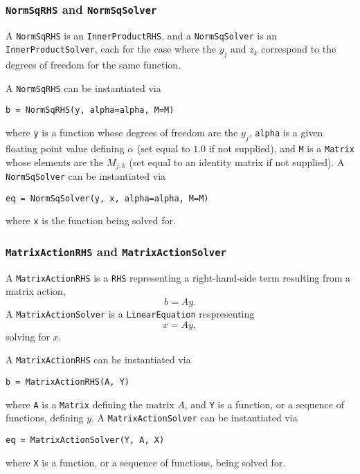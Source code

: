 \documentclass[11pt]{article}
\begin{document}
\subsubsection{\texttt{NormSqRHS} and \texttt{NormSqSolver}}

A \texttt{NormSqRHS} is an \texttt{InnerProductRHS}, and a
\texttt{NormSqSolver} is an \texttt{InnerProductSolver}, each for the case
where the $y_j$ and $z_k$ correspond to the degrees of freedom for the same
function.

A \texttt{NormSqRHS} can be instantiated via
\begin{lstlisting}
b = NormSqRHS(y, alpha=alpha, M=M)
\end{lstlisting}
where \texttt{y} is a function whose degrees of freedom are the $y_j$,
\texttt{alpha} is a given floating point value defining $\alpha$ (set equal to
$1.0$ if not supplied), and \texttt{M} is a \texttt{Matrix} whose elements are
the $M_{j,k}$ (set equal to an identity matrix if not supplied). A
\texttt{NormSqSolver} can be instantiated via
\begin{lstlisting}
eq = NormSqSolver(y, x, alpha=alpha, M=M)
\end{lstlisting}
where \texttt{x} is the function being solved for.

\subsubsection{\texttt{MatrixActionRHS} and \texttt{MatrixActionSolver}}

A \texttt{MatrixActionRHS} is a \texttt{RHS} representing a right-hand-side
term resulting from a matrix action,
\begin{equation*}
  b = A y.
\end{equation*}
A \texttt{MatrixActionSolver} is a \texttt{LinearEquation} respresenting
\begin{equation*}
  x = A y,
\end{equation*}
solving for $x$.

A \texttt{MatrixActionRHS} can be instantiated via
\begin{lstlisting}
b = MatrixActionRHS(A, Y)
\end{lstlisting}
where \texttt{A} is a \texttt{Matrix} defining the matrix $A$, and \texttt{Y}
is a function, or a sequence of functions, defining $y$. A
\texttt{MatrixActionSolver} can be instantiated via
\begin{lstlisting}
eq = MatrixActionSolver(Y, A, X)
\end{lstlisting}
where \texttt{X} is a function, or a sequence of functions, being solved for.
\end{document}
